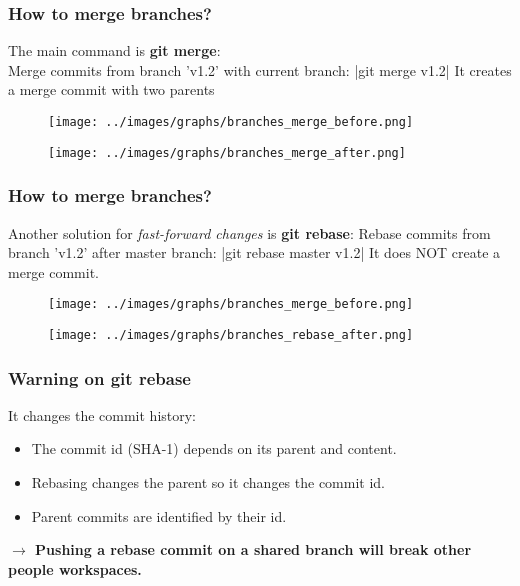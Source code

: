 \begin{frame}
\frametitle{How to merge branches?}
   The main command is {\bf git merge}:\\
   Merge commits from branch 'v1.2' with current branch:
   |git merge v1.2|
   It creates a merge commit with two parents
   \begin{minipage}{0.48\linewidth}
      \begin{figure}
         \centering
         \texttt{[image: ../images/graphs/branches\_merge\_before.png]}
      \end{figure}
   \end{minipage}
   \begin{minipage}{0.48\linewidth}
      \begin{figure}
         \centering
         \texttt{[image: ../images/graphs/branches\_merge\_after.png]}
      \end{figure}
   \end{minipage}
\end{frame}

\begin{frame}
\frametitle{How to merge branches?}
   Another solution for {\it fast-forward changes} is {\bf git rebase}:
   Rebase commits from branch 'v1.2' after master branch:
   |git rebase master v1.2|
   It does NOT create a merge commit.
   \begin{minipage}{0.48\linewidth}
      \begin{figure}
         \centering
         \texttt{[image: ../images/graphs/branches\_merge\_before.png]}
      \end{figure}
   \end{minipage}
   \begin{minipage}{0.48\linewidth}
      \begin{figure}
         \centering
         \texttt{[image: ../images/graphs/branches\_rebase\_after.png]}
      \end{figure}
   \end{minipage}
\end{frame}

\begin{frame}
\frametitle{Warning on git rebase}
   \alert{It changes the commit history:}
   \begin{itemize}
      \item The commit id (SHA-1) depends on its parent and content.
      \item Rebasing changes the parent so it changes the commit id.
      \item Parent commits are identified by their id.
   \end{itemize}
   {\bf $\rightarrow$ Pushing a rebase commit on a shared branch will break other people workspaces.}
\end{frame}

